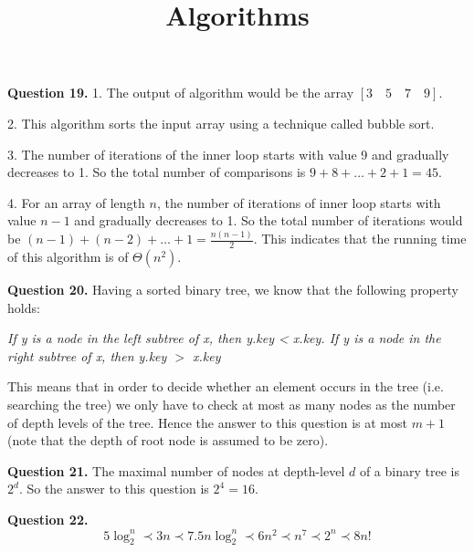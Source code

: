 \documentclass{ximera}
\title{Algorithms}
\begin{document}
\maketitle

\textbf{Question 19.} 1. The output of algorithm would be the array $ [3 \quad 5 \quad 7 \quad 9] $.

2. This algorithm sorts the input array using a technique called bubble sort.

3. The number of iterations of the inner loop starts with value 9 and gradually decreases to 1. So the total number of comparisons is $ 9 + 8 + \ldots + 2 + 1 = 45$.

4. For an array of length $n$, the number of iterations of inner loop starts with value $n-1$ and gradually decreases to 1. So the total number of iterations would be $(n-1) + (n-2) + \ldots + 1 = \frac{n(n-1)}{2}$. This indicates that the running time of this algorithm is of $\Theta(n^2)$.

\textbf{Question 20.} Having a sorted binary tree, we know that the following property holds:

\emph{If y is a node in the left subtree of x, then y.key < x.key. If y is a node in the right subtree of x, then y.key $>$ x.key}

This means that in order to 	decide whether an element occurs in the tree (i.e. searching the tree) we only have to check at most as many nodes as the number of depth levels of the tree. Hence the answer to this question is at most $m+1$ (note that the depth of root node is assumed to be zero). 

\textbf{Question 21.} The maximal number of nodes at depth-level $d$ of a binary tree is $2^d$. So the answer to this question is $2^4 = 16$. 

\textbf{Question 22.}
\begin{equation*}
5 \log_2^n \prec 3n \prec 7.5 n \log_2^n \prec 6n^2 \prec n^7 \prec 2^n \prec 8n!
\end{equation*}
\end{document}

